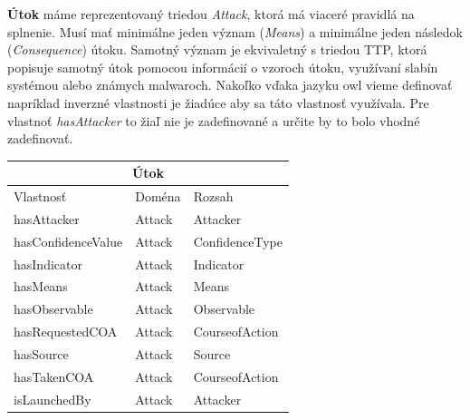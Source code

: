 \documentclass[12pt, a4paper, oneside]{book}
\begin{document}
\textbf{Útok} máme reprezentovaný triedou \textit{Attack}, ktorá má viaceré pravidlá na splnenie. Musí mať minimálne jeden význam (\textit{Means}) a minimálne jeden následok (\textit{Consequence}) útoku. Samotný význam je ekvivaletný s triedou TTP, ktorá popisuje samotný útok pomocou informácií o vzoroch útoku, využívaní slabín systémou alebo známych malwaroch. Nakoľko vďaka jazyku owl vieme definovať napríklad inverzné vlastnosti je žiadúce aby sa táto vlastnosť využívala. Pre vlastnoť \textit{hasAttacker} to žiaľ nie je zadefinované a určite by to bolo vhodné zadefinovať.\\
\begin{tabular}{ |p{6cm}||p{3cm}|p{3cm}|  }
 \hline
 \multicolumn{3}{|c|}{Útok} \\
 \hline
 Vlastnosť & Doména & Rozsah\\
 \hline
 hasAttacker & Attack & Attacker\\
 hasConfidenceValue & Attack & ConfidenceType\\
 hasIndicator & Attack & Indicator\\
 hasMeans & Attack & Means\\
 hasObservable & Attack & Observable\\
 hasRequestedCOA & Attack & CourseofAction\\
 hasSource & Attack & Source\\
 hasTakenCOA & Attack & CourseofAction\\
 isLaunchedBy & Attack & Attacker\\
 \hline
\end{tabular}\\


\backmatter

\nocite{*}



\listoffigures
\end{document}
